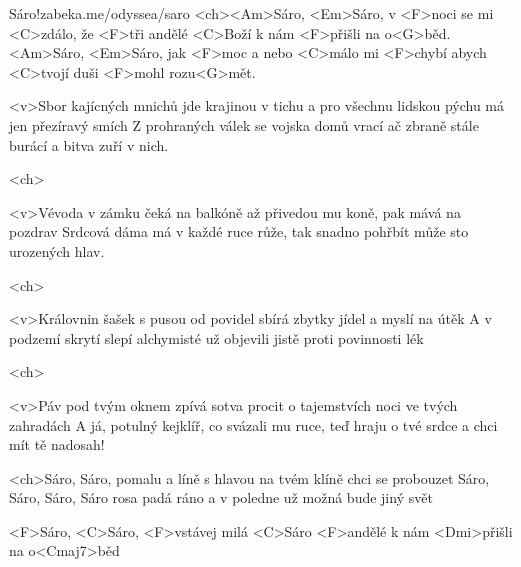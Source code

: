 

\songtitlepage
\listofsongs[1]
\begin{song}[Traband]{1}{Sáro!}{zabeka.me/odyssea/saro}
	<ch><Am>Sáro, <Em>Sáro, v <F>noci se mi <C>zdálo,
	že <F>tři andělé <C>Boží k nám <F>přišli na o<G>běd.
	<Am>Sáro, <Em>Sáro, jak <F>moc a nebo <C>málo
	mi <F>chybí abych <C>tvojí duši <F>mohl rozu<G>mět.

	<v>Sbor kajícných mnichů jde krajinou v tichu
	a pro všechnu lidskou pýchu má jen přezíravý smích
	Z prohraných válek se vojska domů vrací
	ač zbraně stále burácí a bitva zuří v nich.

	<ch>

	<v>Vévoda v zámku čeká na balkóně
	až přivedou mu koně, pak mává na pozdrav
	Srdcová dáma má v každé ruce růže,
	tak snadno pohřbít může sto urozených hlav.

	<ch>

	<v>Královnin šašek s pusou od povidel
	sbírá zbytky jídel a myslí na útěk
	A v podzemí skrytí slepí alchymisté
	už objevili jistě proti povinnosti lék

	<ch>

	<v>Páv pod tvým oknem zpívá sotva procit
	o tajemstvích noci ve tvých zahradách
	A já, potulný kejklíř, co svázali mu ruce,
	teď hraju o tvé srdce a chci mít tě nadosah!

	<ch>Sáro, Sáro, pomalu a líně
	s hlavou na tvém klíně chci se probouzet
	Sáro, Sáro, Sáro, Sáro rosa padá ráno
	a v poledne už možná bude jiný svět

	<F>Sáro, <C>Sáro, <F>vstávej milá <C>Sáro
	<F>andělé k nám <Dmi>přišli na o<Cmaj7>běd


\end{song}
